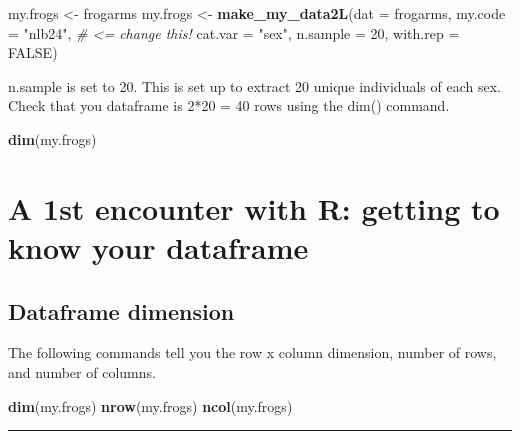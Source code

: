 \documentclass[]{book}
\newenvironment{Shaded}{\begin{snugshade}}{\end{snugshade}}
\newcommand{\KeywordTok}[1]{\textcolor[rgb]{0.13,0.29,0.53}{\textbf{#1}}}
\newcommand{\DataTypeTok}[1]{\textcolor[rgb]{0.13,0.29,0.53}{#1}}
\newcommand{\DecValTok}[1]{\textcolor[rgb]{0.00,0.00,0.81}{#1}}
\newcommand{\StringTok}[1]{\textcolor[rgb]{0.31,0.60,0.02}{#1}}
\newcommand{\CommentTok}[1]{\textcolor[rgb]{0.56,0.35,0.01}{\textit{#1}}}
\newcommand{\OtherTok}[1]{\textcolor[rgb]{0.56,0.35,0.01}{#1}}
\newcommand{\NormalTok}[1]{#1}
\theoremstyle{definition}
\theoremstyle{definition}
\theoremstyle{definition}
\theoremstyle{remark}
\begin{document}
\begin{Shaded}
\begin{Highlighting}[]
\NormalTok{my.frogs <-}\StringTok{ }\NormalTok{frogarms}
\NormalTok{my.frogs <-}\StringTok{ }\KeywordTok{make_my_data2L}\NormalTok{(}\DataTypeTok{dat =}\NormalTok{ frogarms,}
                           \DataTypeTok{my.code =} \StringTok{"nlb24"}\NormalTok{, }\CommentTok{# <=  change this!}
                           \DataTypeTok{cat.var =} \StringTok{"sex"}\NormalTok{,}
                           \DataTypeTok{n.sample =} \DecValTok{20}\NormalTok{,}
                           \DataTypeTok{with.rep =} \OtherTok{FALSE}\NormalTok{)}
\end{Highlighting}
\end{Shaded}

n.sample is set to 20. This is set up to extract 20 unique individuals
of each sex. Check that you dataframe is 2*20 = 40 rows using the dim()
command.

\begin{Shaded}
\begin{Highlighting}[]
\KeywordTok{dim}\NormalTok{(my.frogs)}
\end{Highlighting}
\end{Shaded}

\section{A 1st encounter with R: getting to know your
dataframe}\label{a-1st-encounter-with-r-getting-to-know-your-dataframe}

\subsection{Dataframe dimension}\label{dataframe-dimension}

The following commands tell you the row x column dimension, number of
rows, and number of columns.

\begin{Shaded}
\begin{Highlighting}[]
\KeywordTok{dim}\NormalTok{(my.frogs)}
\KeywordTok{nrow}\NormalTok{(my.frogs)}
\KeywordTok{ncol}\NormalTok{(my.frogs)}
\end{Highlighting}
\end{Shaded}

\begin{center}\rule{0.5\linewidth}{\linethickness}\end{center}
\end{document}
